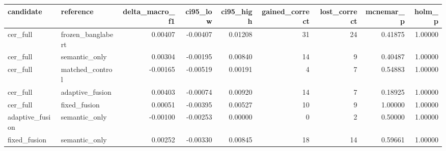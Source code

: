 \begin{tabular}{llrrrrrrr}
\toprule
candidate & reference & delta_macro_f1 & ci95_low & ci95_high & gained_correct & lost_correct & mcnemar_p & holm_p \\
\midrule
cer_full & frozen_banglabert & 0.00407 & -0.00407 & 0.01208 & 31 & 24 & 0.41875 & 1.00000 \\
cer_full & semantic_only & 0.00304 & -0.00195 & 0.00840 & 14 & 9 & 0.40487 & 1.00000 \\
cer_full & matched_control & -0.00165 & -0.00519 & 0.00191 & 4 & 7 & 0.54883 & 1.00000 \\
cer_full & adaptive_fusion & 0.00403 & -0.00074 & 0.00920 & 14 & 7 & 0.18925 & 1.00000 \\
cer_full & fixed_fusion & 0.00051 & -0.00395 & 0.00527 & 10 & 9 & 1.00000 & 1.00000 \\
adaptive_fusion & semantic_only & -0.00100 & -0.00253 & 0.00000 & 0 & 2 & 0.50000 & 1.00000 \\
fixed_fusion & semantic_only & 0.00252 & -0.00330 & 0.00845 & 18 & 14 & 0.59661 & 1.00000 \\
\bottomrule
\end{tabular}
